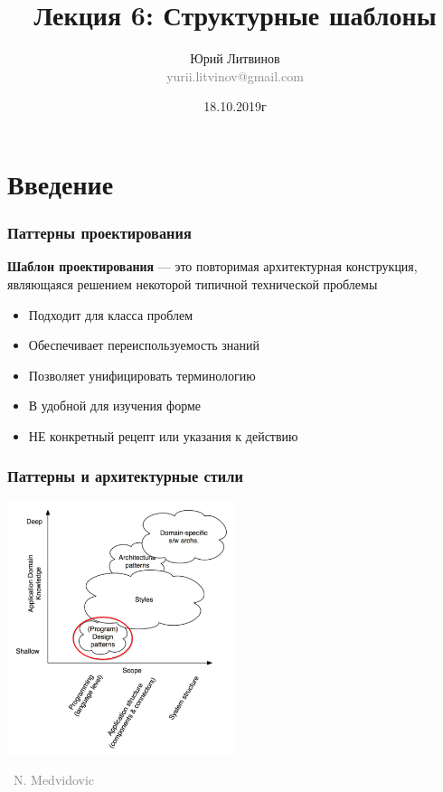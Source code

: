 \documentclass[xetex,mathserif,serif]{beamer}
\title[Структурные шаблоны]{Лекция 6: Структурные шаблоны}
\author[Юрий Литвинов]{Юрий Литвинов\\\small{\textcolor{gray}{yurii.litvinov@gmail.com}}}
\date{18.10.2019г}
\newcommand{\attribution}[1] {
	\vspace{-5mm}\begin{flushright}\begin{scriptsize}\textcolor{gray}{\textcopyright\, #1}\end{scriptsize}\end{flushright}
}
\begin{document}
	\frame{\titlepage}

	\section{Введение}

	\begin{frame}
		\frametitle{Паттерны проектирования}
		\textbf{Шаблон проектирования} --- это повторимая архитектурная конструкция, являющаяся решением некоторой типичной технической проблемы
		\begin{itemize}
			\item Подходит для класса проблем
			\item Обеспечивает переиспользуемость знаний
			\item Позволяет унифицировать терминологию
			\item В удобной для изучения форме
			\item НЕ конкретный рецепт или указания к действию
		\end{itemize}
	\end{frame}

	\begin{frame}
		\frametitle{Паттерны и архитектурные стили}
		\begin{center}
			\includegraphics[width=0.5\textwidth]{architecturalStylesPatternsHighlighted.png}
			\attribution{N. Medvidovic}
		\end{center}
	\end{frame}
\end{document}
